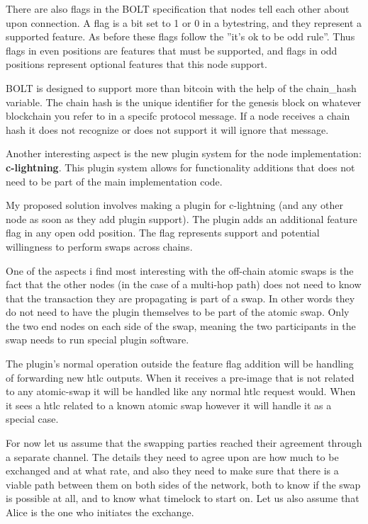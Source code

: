 There are also flags in the BOLT specification that nodes tell each other about
upon connection. A flag is a bit set to 1 or 0 in a bytestring, and they 
represent a supported feature. As before these
flags follow the ''it's ok to be odd rule''. Thus flags in even positions are 
features that must be supported, and flags in odd positions represent optional
features that this node support.

BOLT is designed to support more than bitcoin with the help of the chain\_hash 
variable. The chain hash is the unique identifier for the genesis block on
whatever blockchain you refer to in a specifc protocol message. If a node
receives a chain hash it does not recognize or does not support it will ignore
that message.\cite{bolt}

Another interesting aspect is the new plugin system for the node implementation: 
\textbf{c-lightning}. This plugin system allows for functionality additions that
does not need to be part of the main implementation code. 

My proposed solution involves making a plugin for c-lightning (and any other 
node as soon as they add plugin support). The plugin adds an additional 
feature flag in any open odd position. The flag represents support and potential
willingness to perform swaps across chains. 

One of the aspects i find most interesting with the off-chain atomic swaps is
the fact that the other nodes (in the case of a multi-hop path) does not need
to know that the transaction they are propagating is part of a swap. In other 
words they do not need to have the plugin themselves to be part of the atomic
swap. Only the two end nodes on each side of the swap, meaning the two 
participants in the swap needs to run special plugin software. 

The plugin's normal operation outside the feature flag addition will be handling 
of forwarding new htlc outputs. When it receives a pre-image that is not related 
to any atomic-swap it will be handled like any normal htlc request would. 
When it sees a htlc related to a known atomic swap however it will handle it as 
a special case.

For now let us assume that the swapping parties reached their agreement through 
a separate channel. The details they need to agree upon are how much to be 
exchanged and at what rate, and also they need to make sure that there is a 
viable path between them on both sides of the network, both to know if the swap 
is possible at all, and to know what timelock to start on. Let us also 
assume that Alice is the one who initiates the exchange.

